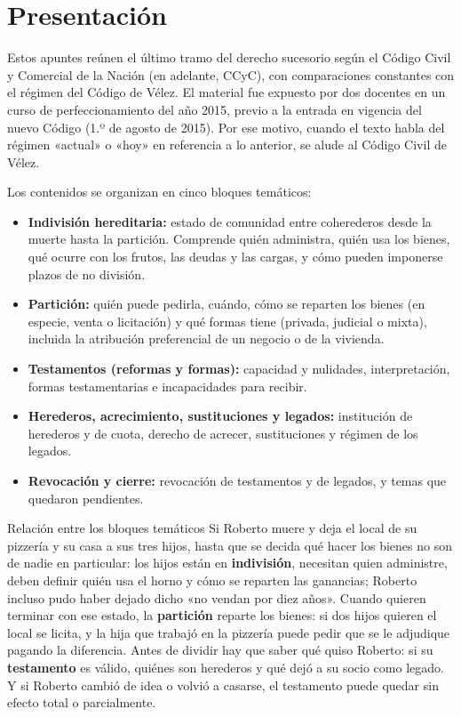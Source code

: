 \documentclass[12pt,oneside]{book}
\begin{document}
\chapter*{Presentación}

Estos apuntes reúnen el último tramo del derecho sucesorio según el Código Civil y Comercial de la Nación (en adelante, CCyC), con comparaciones constantes con el régimen del Código de Vélez. El material fue expuesto por dos docentes en un curso de perfeccionamiento del año 2015, previo a la entrada en vigencia del nuevo Código (1.º de agosto de 2015). Por ese motivo, cuando el texto habla del régimen «actual» o «hoy» en referencia a lo anterior, se alude al Código Civil de Vélez.

Los contenidos se organizan en cinco bloques temáticos:

\begin{itemize}
    \item \textbf{Indivisión hereditaria:} estado de comunidad entre coherederos desde la muerte hasta la partición. Comprende quién administra, quién usa los bienes, qué ocurre con los frutos, las deudas y las cargas, y cómo pueden imponerse plazos de no división.
    \item \textbf{Partición:} quién puede pedirla, cuándo, cómo se reparten los bienes (en especie, venta o licitación) y qué formas tiene (privada, judicial o mixta), incluida la atribución preferencial de un negocio o de la vivienda.
    \item \textbf{Testamentos (reformas y formas):} capacidad y nulidades, interpretación, formas testamentarias e incapacidades para recibir.
    \item \textbf{Herederos, acrecimiento, sustituciones y legados:} institución de herederos y de cuota, derecho de acrecer, sustituciones y régimen de los legados.
    \item \textbf{Revocación y cierre:} revocación de testamentos y de legados, y temas que quedaron pendientes.
\end{itemize}

\begin{example}{Relación entre los bloques temáticos}
Si Roberto muere y deja el local de su pizzería y su casa a sus tres hijos, hasta que se decida qué hacer los bienes no son de nadie en particular: los hijos están en \textbf{indivisión}, necesitan quien administre, deben definir quién usa el horno y cómo se reparten las ganancias; Roberto incluso pudo haber dejado dicho «no vendan por diez años». Cuando quieren terminar con ese estado, la \textbf{partición} reparte los bienes: si dos hijos quieren el local se licita, y la hija que trabajó en la pizzería puede pedir que se le adjudique pagando la diferencia. Antes de dividir hay que saber qué quiso Roberto: si su \textbf{testamento} es válido, quiénes son herederos y qué dejó a su socio como legado. Y si Roberto cambió de idea o volvió a casarse, el testamento puede quedar sin efecto total o parcialmente.
\end{example}
\end{document}
